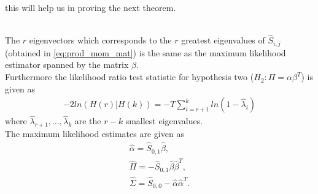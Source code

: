this will help us in proving the next theorem.
\begin{thm}{\phantom}\\
    The $r$ eigenvectors which corresponds to the $r$ greatest eigenvalues of $\hat{S}_{i,j}$ (obtained in \eqref{eq:prod_mom_mat}) is the same as the maximum likelihood estimator spanned by the matrix $\beta$.\\
    Furthermore the likelihood ratio test statistic for hypothesis two ($H_2:\Pi=\alpha\beta^T$) is given as 
    \begin{align}\label{eq:lrmax_coint_r}
        -2ln(H(r)|H(k))=-T\sum_{i=r+1}^k ln(1-\hat{\lambda}_i)
    \end{align}
    where $\hat{\lambda}_{r+1},\ldots,\hat{\lambda}_{k}$ are the $r-k$ smallest eigenvalues.\\
    The maximum likelihood estimates are given as
    \begin{align*}
        \hat{\alpha}=\hat{S}_{0,1}\hat{\beta},\\
        \hat{\Pi}=-\hat{S}_{0,1}\hat{\beta}\hat{\beta}^T,\\
        \hat{\Sigma}=\hat{S}_{0,0}-\hat{\alpha}\hat{\alpha}^T.
    \end{align*}
\end{thm}
